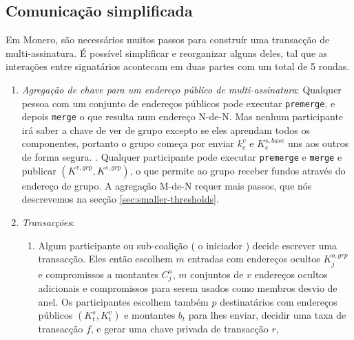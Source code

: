 \subsection{Comunicação simplificada}
\label{sec:simplified-communication}

Em Monero, são necessários muitos passos para construír uma transacção de multi-assinatura. É possível simplificar e reorganizar alguns deles, tal que as interações entre signatários acontecam em duas partes com um total de 5 rondas.    
\begin{enumerate}
    \item {\it Agregação de chave para um endereço público de multi-assinatura}:  
Qualquer pessoa com um conjunto de endereços públicos pode executar {\tt premerge}, e depois {\tt merge} o que resulta num endereço N-de-N.
Mas nenhum participante irá saber a chave de ver de grupo excepto se eles aprendam todos os componentes, portanto o grupo começa por enviar $k^{v}_e$ e $K^{s,base}_e$ uns aos outros de forma segura. 
. 
Qualquer participante pode executar {\tt premerge} e {\tt merge} e publicar $(K^{v,grp},K^{s,grp})$, o que permite ao grupo receber fundos através do endereço de grupo. A agregação M-de-N requer mais passos, que nós descrevemos na secção \ref{sec:smaller-thresholds}. 
    \item {\it Transacções}:
    \begin{enumerate}
        \item Algum participante ou sub-coalição ( o iniciador )
decide escrever uma transacção. Eles então escolhem $m$ entradas com endereços ocultos $K^{o,grp}_{j}$ e compromissos a montantes $C^a_j$, $m$ conjuntos de $v$ endereços ocultos adicionais e compromissos para serem usados como membros desvio de anel. Os participantes escolhem também $p$ destinatários com endereços públicos $(K^s_t, K^v_t)$ e montantes $b_t$ para lhes enviar, decidir uma taxa de transacção  $f$, e gerar uma chave privada de transacção $r$,         

\end{enumerate}
\end{enumerate}
